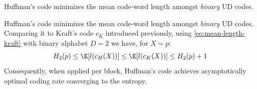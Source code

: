 \documentclass[toc, titlepaged]{../cs-classes/cs-classes}
\begin{document}
\begin{lemma}
    \label{lem:optimal-binary-code}
    Huffman's code minimizes the mean code-word length amongst \emph{binary} UD codes.
\end{lemma}

\begin{remark}
    Huffman's code minimizes the mean code-word length amongst \emph{binary} UD codes. Comparing it to Kraft's code $c_K$ introduced previously, using \eqref{eq:mean-length-kraft} with binary alphabet $D=2$ we have, for $X\sim p$:
    \begin{equation}
        H_2(p)\leq\E[l(c_H(X))]\leq\E[l(c_K(X))]\leq H_2(p)+1
    \end{equation}
    Consequently, when applied per block, Huffman's code achieves asymptotically optimal coding rate converging to the entropy.
\end{remark}
\end{document}
